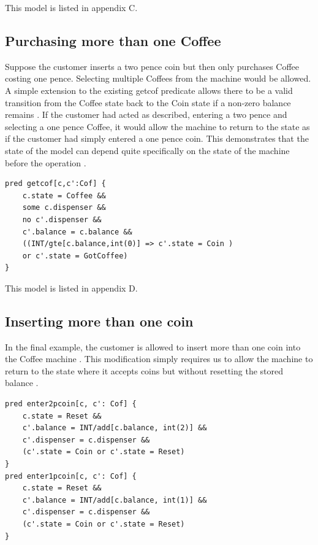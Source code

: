\documentclass[a4paper,12pt]{report}
\begin{document}
\begin{onehalfspacing}
 This model is listed in appendix C.
 
\subsection{Purchasing more than one Coffee}
\label{Purchasing more than one coffee}

Suppose the customer inserts a two pence coin but then only purchases Coffee costing one pence. Selecting multiple Coffees from the machine would be allowed. A simple extension to the existing getcof predicate allows there to be a valid transition from the Coffee state back to the Coin state if a non-zero balance remains \cite{RussellBoyatt}. If the customer had acted as described, entering a two pence and selecting a one pence Coffee, it would allow the machine to return to the state as if the customer had simply entered a one pence coin. This demonstrates that the state of the model can depend quite specifically on the state of the machine before the operation \cite{RussellBoyatt}.

\begin{verbatim}
pred getcof[c,c':Cof] {
	c.state = Coffee &&
	some c.dispenser &&
	no c'.dispenser &&
	c'.balance = c.balance &&
	((INT/gte[c.balance,int(0)] => c'.state = Coin )
	or c'.state = GotCoffee)
}
\end{verbatim}

This model is listed in appendix D.

\subsection{Inserting more than one coin}
\label{Inserting more than one coin}

In the final example, the customer is allowed to insert more than one coin into the Coffee machine \cite{RussellBoyatt}. This modification simply requires us to allow the machine to return to the state where it accepts coins but without resetting the stored balance \cite{RussellBoyatt}.

\begin{verbatim}
pred enter2pcoin[c, c': Cof] {
	c.state = Reset &&
	c'.balance = INT/add[c.balance, int(2)] &&
	c'.dispenser = c.dispenser &&
	(c'.state = Coin or c'.state = Reset)
}
pred enter1pcoin[c, c': Cof] {
	c.state = Reset &&
	c'.balance = INT/add[c.balance, int(1)] &&
	c'.dispenser = c.dispenser &&
	(c'.state = Coin or c'.state = Reset)
}
\end{verbatim}


\end{onehalfspacing}
\end{document}
